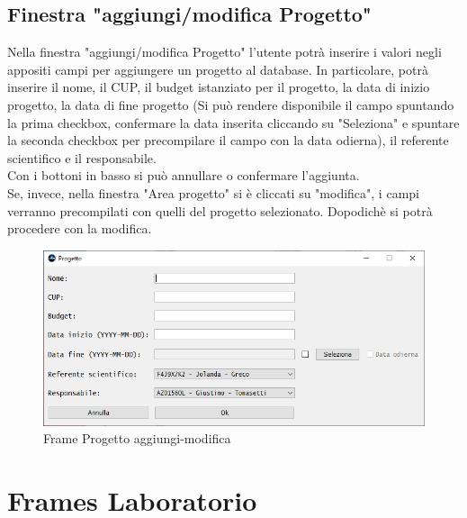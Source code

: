         \subsection {Finestra "aggiungi/modifica Progetto"}
            Nella finestra "aggiungi/modifica Progetto" l'utente potrà inserire i valori negli appositi campi per aggiungere un progetto al database. In particolare, potrà inserire il nome, il CUP, il budget istanziato per il progetto, la data di inizio progetto, la data di fine progetto (Si può rendere disponibile il campo spuntando la prima checkbox, confermare la data inserita cliccando su "Seleziona" e spuntare la seconda checkbox per precompilare il campo con la data odierna), il referente scientifico e il responsabile.\\
            Con i bottoni in basso si può annullare o confermare l'aggiunta.\\
            Se, invece, nella finestra "Area progetto" si è cliccati su "modifica", i campi verranno precompilati con quelli del progetto selezionato. Dopodichè si potrà procedere con la modifica.
            \begin{figure}[htbp!]
                \centering
                    \vspace{2\baselineskip}
                    \includegraphics[width=0.7\linewidth]{Immagini/Frames/Frame aggiungi-modifica/Frame Progetto aggiungi-modifica.png}
                \caption{Frame Progetto aggiungi-modifica}
                \label{fig:Frame Progetto aggiungi-modifica}
            \end{figure}

    \newpage

    \section{Frames Laboratorio}
